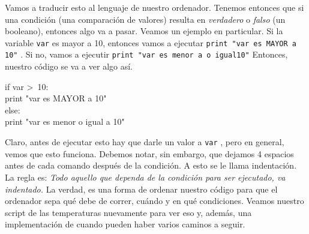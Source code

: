 \documentclass[10pt,letterpaper]{article}
\newcommand{\inlinecode}[1]{
\colorbox{light-gray}{\texttt{#1}}
}
\newenvironment{Code}
{
\begin{lrbox}{\selvestebox}%
\begin{minipage}{\dimexpr\columnwidth-2\fboxsep\relax}
\fontfamily{\ttdefault}\selectfont
}
{\end{minipage}\end{lrbox}%
\begin{center}
\colorbox{light-gray}{\usebox{\selvestebox}}
\end{center}
}
\begin{document}
Vamos a traducir esto al lenguaje de nuestro ordenador. Tenemos entonces que si una condici\'on (una comparaci\'on de valores) resulta en \emph{verdadero} o \emph{falso} (un booleano), entonces algo va a pasar. Veamos un ejemplo en particular. Si la variable \inlinecode{var} es mayor a 10, entonces vamos a ejecutar \inlinecode{print "var es MAYOR a 10"}. Si no, vamos a ejecutir \inlinecode{print "var es menor a  o igual10"} Entonces, nuestro c\'odigo se va a ver algo as\'i.

\begin{Code}
if var >\ 10:\\
\hspace*{5mm} print "var es MAYOR a 10"\\
else:\\
\hspace*{5mm} print "var es menor o igual a 10"
\end{Code}

Claro, antes de ejecutar esto hay que darle un valor a \inlinecode{var}, pero en general, vemos que esto funciona. Debemos notar, sin embargo, que dejamos 4 espacios antes de cada comando despu\'es de la condici\'on. A esto se le llama indentaci\'on. La regla es: \textit{Todo aquello que dependa de la condici\'on para ser ejecutado, va indentado.} La verdad, es una forma de ordenar nuestro c\'odigo para que el ordenador sepa qu\'e debe de correr, cu\'ando y en qu\'e condiciones. Veamos nuestro script de las temperaturas nuevamente para ver eso y, adem\'as, una implementaci\'on de cuando pueden haber varios caminos a seguir.
\end{document}
